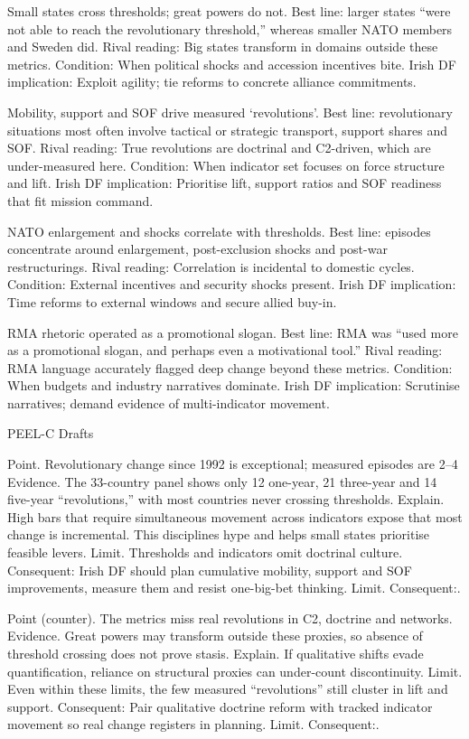Small states cross thresholds; great powers do not.
Best line: larger states “were not able to reach the revolutionary threshold,” whereas smaller NATO members and Sweden did.
Rival reading: Big states transform in domains outside these metrics.
Condition: When political shocks and accession incentives bite.
Irish DF implication: Exploit agility; tie reforms to concrete alliance commitments.

Mobility, support and SOF drive measured ‘revolutions’.
Best line: revolutionary situations most often involve tactical or strategic transport, support shares and SOF.
Rival reading: True revolutions are doctrinal and C2-driven, which are under-measured here.
Condition: When indicator set focuses on force structure and lift.
Irish DF implication: Prioritise lift, support ratios and SOF readiness that fit mission command.

NATO enlargement and shocks correlate with thresholds.
Best line: episodes concentrate around enlargement, post-exclusion shocks and post-war restructurings.
Rival reading: Correlation is incidental to domestic cycles.
Condition: External incentives and security shocks present.
Irish DF implication: Time reforms to external windows and secure allied buy-in.

RMA rhetoric operated as a promotional slogan.
Best line: RMA was “used more as a promotional slogan, and perhaps even a motivational tool.”
Rival reading: RMA language accurately flagged deep change beyond these metrics.
Condition: When budgets and industry narratives dominate.
Irish DF implication: Scrutinise narratives; demand evidence of multi-indicator movement.

PEEL-C Drafts

Point. Revolutionary change since 1992 is exceptional; measured episodes are 2–4%
Evidence. The 33-country panel shows only 12 one-year, 21 three-year and 14 five-year “revolutions,” with most countries never crossing thresholds.
Explain. High bars that require simultaneous movement across indicators expose that most change is incremental. This disciplines hype and helps small states prioritise feasible levers.
Limit. Thresholds and indicators omit doctrinal culture. Consequent: Irish DF should plan cumulative mobility, support and SOF improvements, measure them and resist one-big-bet thinking. Limit. Consequent:.

Point (counter). The metrics miss real revolutions in C2, doctrine and networks.
Evidence. Great powers may transform outside these proxies, so absence of threshold crossing does not prove stasis.
Explain. If qualitative shifts evade quantification, reliance on structural proxies can under-count discontinuity.
Limit. Even within these limits, the few measured “revolutions” still cluster in lift and support. Consequent: Pair qualitative doctrine reform with tracked indicator movement so real change registers in planning. Limit. Consequent:.

